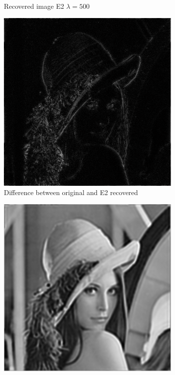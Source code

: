 \documentclass[a4paper, 10pt, conference] {article}
\begin{document}
\begin{figure}[H]
\begin{subfigure}{0.49\textwidth}
		\caption{Recovered image E2 $\lambda = 500$}
	\end{subfigure}
	\begin{subfigure}{0.49\textwidth} 
		\centering						
		\includegraphics[scale=0.45]{comparison/difference2.PNG}
		\caption{Difference between original and E2 recovered}
	\end{subfigure}
	\begin{subfigure}{0.49\textwidth} 
		\centering						
		\includegraphics[scale=0.45]{comparison/lucy.PNG}

\end{subfigure}
\end{figure}
\end{document}
